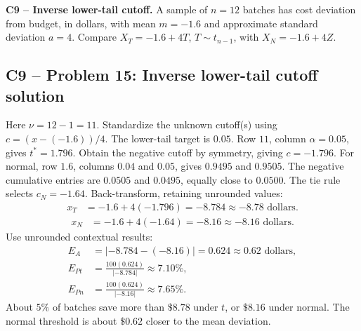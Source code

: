 {
\textbf{C9 -- Inverse lower-tail cutoff.} A sample of $n=12$ batches has cost deviation from budget, in dollars, with mean $m=-1.6$ and approximate standard deviation $a=4$. Compare $X_T=-1.6+4T$, $T\sim t_{n-1}$, with $X_N=-1.6+4Z$.
\label{sol:q15}
\subsection*{C9 -- Problem 15: Inverse lower-tail cutoff solution }
Here $\nu=12-1=11$. Standardize the unknown cutoff(s) using $c=(x-(-1.6))/4$. The lower-tail target is $0.05$.
Row $11$, column $\alpha=0.05$, gives $t^*=1.796$. 
Obtain the negative cutoff by symmetry, giving $c=-1.796$.
For normal, row $1.6$, columns $0.04$ and $0.05$, gives $0.9495$ and $0.9505$. The negative cumulative entries are $0.0505$ and $0.0495$, equally close to $0.0500$. The tie rule selects $c_N=-1.64$.
Back-transform, retaining unrounded values:
\[
\begin{aligned}
x_T&=-1.6+4(-1.796)=-8.784\approx\boxed{-8.78\text{ dollars}}.
\end{aligned}
\]
\[
\begin{aligned}
x_N&=-1.6+4(-1.64)=-8.16\approx\boxed{-8.16\text{ dollars}}.
\end{aligned}
\]
Use unrounded contextual results:
\[
\begin{aligned}
E_{A}&=|-8.784-(-8.16)|=0.624\approx\boxed{0.62\text{ dollars}},\\
E_{Pt}&=\frac{100(0.624)}{|-8.784|}\approx\boxed{7.10\%},\\
E_{Pn}&=\frac{100(0.624)}{|-8.16|}\approx\boxed{7.65\%}.
\end{aligned}
\]
About $5\%$ of batches save more than $\$8.78$ under $t$, or $\$8.16$ under normal. The normal threshold is about $\$0.62$ closer to the mean deviation.
\secInicio[][sec:q15]
}


